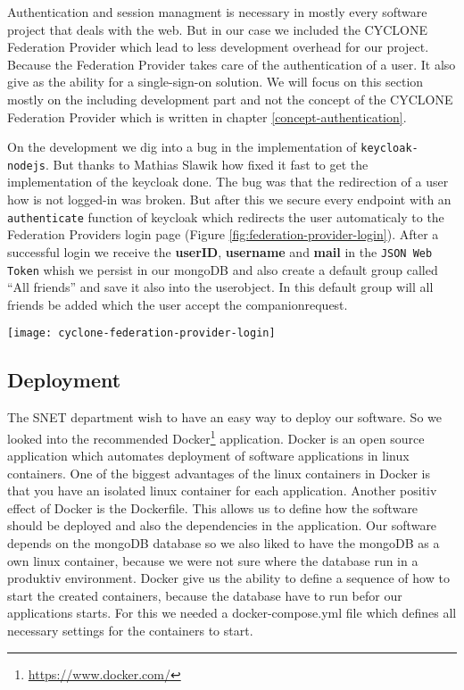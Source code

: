 Authentication and session managment is necessary in mostly every software project that deals with the web. But in our case we included the CYCLONE Federation Provider which lead to less development overhead for our project. Because the Federation Provider takes care of the authentication of a user. It also give as the ability for a single-sign-on solution. We will focus on this section mostly on the including development part and not the concept of the CYCLONE Federation Provider which is written in chapter \ref{concept-authentication}.

On the development we dig into a bug in the implementation of \texttt{keycloak-nodejs}. But thanks to Mathias Slawik how fixed it fast to get the implementation of the keycloak done. The bug was that the redirection of a user how is not logged-in was broken. But after this we secure every endpoint with an \texttt{authenticate} function of keycloak which redirects the user automaticaly to the Federation Providers login page (Figure \ref{fig:federation-provider-login}). After a successful login we receive the \textbf{userID}, \textbf{username} and \textbf{mail} in the \texttt{JSON Web Token} whish we persist in our mongoDB and also create a default group called \enquote{All friends} and save it also into the userobject. In this default group will all friends be added which the user accept the companionrequest.

\begin{center}
    \texttt{[image: cyclone-federation-provider-login]}\\
    \label{fig:federation-provider-login}
\end{center}

\subsection{Deployment}

The SNET department wish to have an easy way to deploy our software. So we looked into the recommended Docker\footnote{\url{https://www.docker.com/}} application. Docker is an open source application which automates deployment of software applications in linux containers. One of the biggest advantages of the linux containers in Docker is that you have an isolated linux container for each application. Another positiv effect of Docker is the Dockerfile. This allows us to define how the software should be deployed and also the dependencies in the application. Our software depends on the mongoDB database so we also liked to have the mongoDB as a own linux container, because we were not sure where the database run in a produktiv environment. Docker give us the ability to define a sequence of how to start the created containers, because the database have to run befor our applications starts. For this we needed a docker-compose.yml file which defines all necessary settings for the containers to start.

